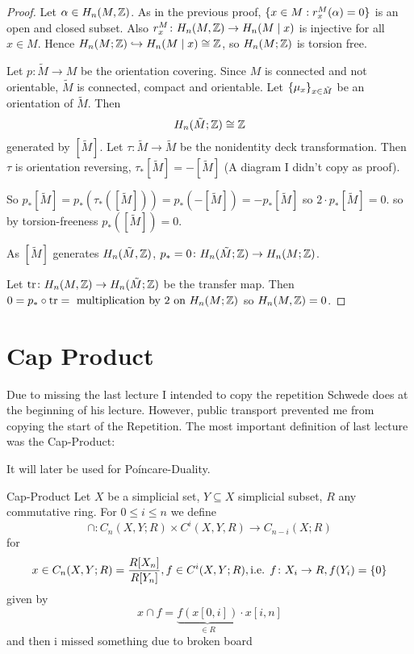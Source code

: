 \documentclass[language=english]{TemplateLecture}
\begin{document}
\begin{proof}
    Let \(\alpha \in H_n(M, \mathbb{Z})\). As in the previous proof,
    \(\{x \in M : r_x^M(\alpha) = 0\}\) is an open and closed subset. Also \(r_x^M\colon H_n(M, \mathbb{Z}) \to H_n(M \mid x)\) is injective for all \(x \in M\). Hence \(H_n(M; \mathbb{Z}) \hookrightarrow H_n(M \mid x) \cong \mathbb{Z}\), so \(H_n(M; \mathbb{Z})\) is torsion free.

    Let \(p\colon \tilde M \to M\) be the orientation covering. Since \(M\) is connected and not orientable, \(\tilde M\) is connected, compact and orientable. Let \(\{\mu_x\}_{x \in \tilde M}\) be an orientation of \(\tilde M\). Then
    \[H_n(\tilde M; \mathbb{Z}) \cong \mathbb{Z}\]
    generated by \([\tilde M]\). Let \(\tau\colon \tilde M \to \tilde M\) be the nonidentity deck transformation. Then \(\tau\) is orientation reversing, \(\tau_*[\tilde M] = - [\tilde M]\) (A diagram I didn't copy as proof).

    So \(p_*[\tilde M] = p_*(\tau_*([\tilde M])) = p_*(- [\tilde M]) = - p_* [\tilde M]\) so \(2 \cdot p_*[\tilde M] = 0\). so by torsion-freeness \(p_*([\tilde M]) = 0\).

    As \([\tilde M]\) generates \(H_n(\tilde M, \mathbb{Z})\), \(p_* = 0\colon H_n(\tilde M; \mathbb{Z}) \to H_n(M; \mathbb{Z})\).

    Let \(\mathrm{tr}\colon H_n(M, \mathbb{Z}) \to H_n(\tilde M; \mathbb{Z})\) be the transfer map. Then \(0 = p_* \circ \mathrm{tr} = \text{ multiplication by 2 on } H_n(M; \mathbb{Z}) \) so \(H_n(M, \mathbb{Z}) = 0\).
\end{proof}




\chapter{Cap Product}

Due to missing the last lecture I intended to copy the repetition Schwede does at the beginning of his lecture. However, public transport prevented me from copying the start of the Repetition. The most important definition of last lecture was the Cap-Product:

It will later be used for Poíncare-Duality.

\begin{defi}{Cap-Product}{}
    Let \(X\) be a simplicial set, \(Y \subseteq X\) simplicial subset, \(R\) any commutative ring. For \(0 \leq i \leq n\) we define
    \[\cap \colon C_n(X, Y ; R) \times C^{i}(X,Y, R) \to C_{n-i}(X;R)\]
    for
    \[x \in C_n(X,Y;R) = \frac{R[X_n]}{R[Y_n]}, f \in C^{i}(X,Y;R), \text{i.e. } f \colon X_i \to R, f(Y_i) = \{0\}\]
    given by
    \[x \cap f = \underbrace{f(x[0,i])}_{\in R} \cdot x[i, n]\]
    and then i missed something due to broken board
\end{defi}
\end{document}
